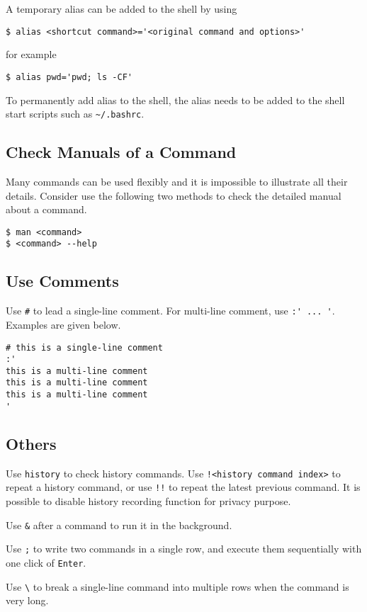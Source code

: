 A temporary alias can be added to the shell by using
\begin{lstlisting}
$ alias <shortcut command>='<original command and options>'
\end{lstlisting}
for example
\begin{lstlisting}
$ alias pwd='pwd; ls -CF'
\end{lstlisting}

To permanently add alias to the shell, the alias needs to be added to the shell start scripts such as \verb|~/.bashrc|.

\subsection{Check Manuals of a Command}

Many commands can be used flexibly and it is impossible to illustrate all their details. Consider use the following two methods to check the detailed manual about a command.
\begin{lstlisting}
$ man <command>
$ <command> --help
\end{lstlisting}

\subsection{Use Comments}

Use \verb|#| to lead a single-line comment. For multi-line comment, use \verb|:' ... '|. Examples are given below.
\begin{lstlisting}
# this is a single-line comment
:'
this is a multi-line comment
this is a multi-line comment
this is a multi-line comment
'
\end{lstlisting}

\subsection{Others}

Use \verb|history| to check history commands. Use \verb|!<history command index>| to repeat a history command, or use \verb|!!| to repeat the latest previous command. It is possible to disable history recording function for privacy purpose.

Use \verb|&| after a command to run it in the background.

Use \verb|;| to write two commands in a single row, and execute them sequentially with one click of \verb|Enter|.

Use \verb|\| to break a single-line command into multiple rows when the command is very long.

